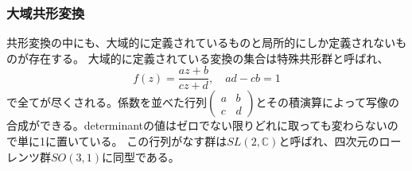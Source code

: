 \documentclass[11pt, aps, longbibliography]{article}
\numberwithin{equation}{section}
\begin{document}
        \subsubsection{大域共形変換}
        共形変換の中にも、大域的に定義されているものと局所的にしか定義されないものが存在する。
        大域的に定義されている変換の集合は特殊共形群と呼ばれ、
        \begin{equation}
            f(z) = \frac{az+b}{cz+d}, \quad ad-cb=1
        \end{equation}
        で全てが尽くされる。係数を並べた行列$\begin{pmatrix} a & b \\ c & d \end{pmatrix}$とその積演算によって写像の合成ができる。determinantの値はゼロでない限りどれに取っても変わらないので単に1に置いている。
        この行列がなす群は$SL(2,\mathbb{C})$と呼ばれ、四次元のローレンツ群$SO(3,1)$に同型である。
\end{document}
